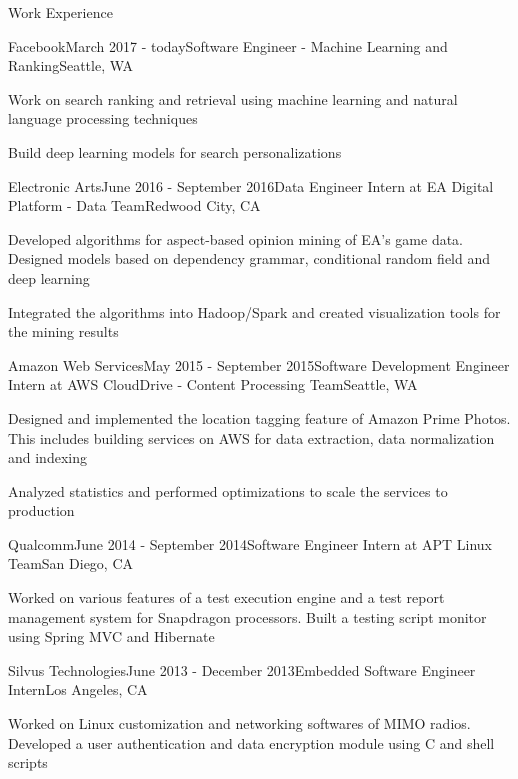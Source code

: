 \documentclass{resume} %
\begin{document}
\begin{rSection}{Work Experience}

\begin{rSubsection}{Facebook}{March 2017 - today}{Software Engineer - Machine Learning and Ranking}{Seattle, WA}
\item Work on search ranking and retrieval using machine learning and natural language processing techniques
\item Build deep learning models for search personalizations
\end{rSubsection}


\begin{rSubsection}{Electronic Arts}{June 2016 - September 2016}{Data Engineer Intern at EA Digital Platform - Data Team}{Redwood City, CA}
\item Developed algorithms for aspect-based opinion mining of EA's game data. Designed models based on dependency grammar, conditional random field and deep learning
\item Integrated the algorithms into Hadoop/Spark and created visualization tools for the mining results
\end{rSubsection}



\begin{rSubsection}{Amazon Web Services}{May 2015 - September 2015}{Software Development Engineer Intern at AWS CloudDrive - Content Processing Team}{Seattle, WA}
\item Designed and implemented the location tagging feature of Amazon Prime Photos. This includes building services on AWS for data extraction, data normalization and indexing
\item Analyzed statistics and performed optimizations to scale the services to production
\end{rSubsection}


\begin{rSubsection}{Qualcomm}{June 2014 - September 2014}{Software Engineer Intern at APT Linux Team}{San Diego, CA}
\item Worked on various features of a test execution engine and a test report management system for Snapdragon processors. Built a testing script monitor using Spring MVC and Hibernate
\end{rSubsection}


\begin{rSubsection}{Silvus Technologies}{June 2013 - December 2013}{Embedded Software Engineer Intern}{Los Angeles, CA}
\item Worked on Linux customization and networking softwares of MIMO radios. Developed a user authentication and data encryption module using C and shell scripts
\end{rSubsection}

\end{rSection}
\end{document}
